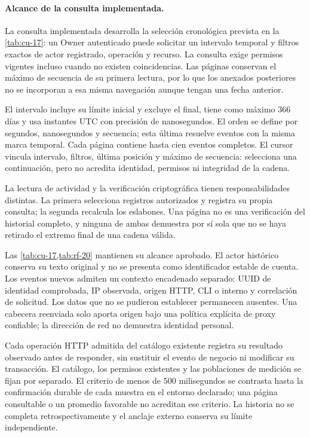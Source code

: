 \paragraph{Alcance de la consulta implementada.}\label{sec:diseno-bitacora}
La consulta implementada desarrolla la selección cronológica prevista en la
\cref{tab:cu-17}: un Owner autenticado puede solicitar un intervalo temporal y
filtros exactos de actor registrado, operación y recurso. La consulta exige
permisos vigentes incluso cuando no existen coincidencias. Las páginas conservan
el máximo de secuencia de su primera lectura, por lo que los anexados posteriores
no se incorporan a esa misma navegación aunque tengan una fecha anterior.

El intervalo incluye su límite inicial y excluye el final, tiene como máximo
366 días y usa instantes UTC con precisión de nanosegundos. El orden se define
por segundos, nanosegundos y secuencia; esta última resuelve eventos con la misma
marca temporal. Cada página contiene hasta cien eventos completos. El cursor
vincula intervalo, filtros, última posición y máximo de secuencia: selecciona
una continuación, pero no acredita identidad, permisos ni integridad de la cadena.

La lectura de actividad y la verificación criptográfica tienen responsabilidades
distintas. La primera selecciona registros autorizados y registra su propia
consulta; la segunda recalcula los eslabones. Una página no es una verificación
del historial completo, y ninguna de ambas demuestra por sí sola que no se haya
retirado el extremo final de una cadena válida.

Las \cref{tab:cu-17,tab:rf-20} mantienen su alcance aprobado. El actor histórico
conserva su texto original y no se presenta como identificador estable de cuenta.
Los eventos nuevos admiten un contexto encadenado separado: UUID de identidad
comprobada, IP observada, origen HTTP, CLI o interno y correlación de solicitud.
Los datos que no se pudieron establecer permanecen ausentes. Una cabecera
reenviada solo aporta origen bajo una política explícita de proxy confiable;
la dirección de red no demuestra identidad personal.

Cada operación HTTP admitida del catálogo existente registra su resultado
observado antes de responder, sin sustituir el evento de negocio ni modificar
su transacción. El catálogo, los permisos existentes y las poblaciones de
medición se fijan por separado. El criterio de menos de 500 milisegundos se
contrasta hasta la confirmación durable de cada muestra en el entorno declarado;
una página consultable o un promedio favorable no acreditan ese criterio.
La historia no se completa retrospectivamente y el anclaje externo conserva
su límite independiente.
